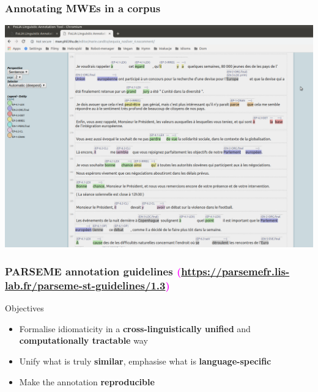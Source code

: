 \documentclass[xcolor=dvipsnames]{beamer}
\begin{document}
\begin{frame} 
\frametitle{Annotating MWEs in a corpus}

\includegraphics[scale=0.23]{Images/flat.png}

\end{frame}

\begin{frame}
  \frametitle{PARSEME annotation guidelines \textcolor{magenta}{{\scriptsize (\url{https://parsemefr.lis-lab.fr/parseme-st-guidelines/1.3})}}}


\vspace{-0.2cm}

\begin{block}{Objectives} 
\begin{itemize}
\item Formalise idiomaticity in a \textbf{cross-linguistically unified} and \textbf{computationally tractable} way
\item Unify what is truly \textbf{similar}, emphasise what is \textbf{language-specific}
\item Make the annotation \textbf{reproducible}
\end{itemize}
\end{block}


\end{frame}
\end{document}
